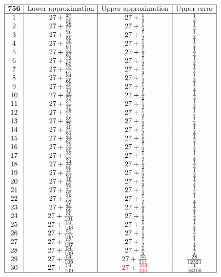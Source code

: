 \documentclass{amsart}
\begin{document}
$$\begin{array}{|c|c|c|c|}
 \hline
 {\bf 756}&\text{Lower approximation}&\text{Upper approximation}&\text{Upper error}\\
 \hline
 1&27+\frac{27}{55}&27+\frac{1}{2}&\frac{1}{4}\\
2&27+\frac{28}{57}&27+\frac{1}{2}&\frac{1}{4}\\
3&27+\frac{29}{59}&27+\frac{1}{2}&\frac{1}{4}\\
4&27+\frac{30}{61}&27+\frac{1}{2}&\frac{1}{4}\\
5&27+\frac{31}{63}&27+\frac{1}{2}&\frac{1}{4}\\
6&27+\frac{32}{65}&27+\frac{1}{2}&\frac{1}{4}\\
7&27+\frac{33}{67}&27+\frac{1}{2}&\frac{1}{4}\\
8&27+\frac{34}{69}&27+\frac{1}{2}&\frac{1}{4}\\
9&27+\frac{35}{71}&27+\frac{1}{2}&\frac{1}{4}\\
10&27+\frac{36}{73}&27+\frac{1}{2}&\frac{1}{4}\\
11&27+\frac{37}{75}&27+\frac{1}{2}&\frac{1}{4}\\
12&27+\frac{38}{77}&27+\frac{1}{2}&\frac{1}{4}\\
13&27+\frac{39}{79}&27+\frac{1}{2}&\frac{1}{4}\\
14&27+\frac{40}{81}&27+\frac{1}{2}&\frac{1}{4}\\
15&27+\frac{41}{83}&27+\frac{1}{2}&\frac{1}{4}\\
16&27+\frac{42}{85}&27+\frac{1}{2}&\frac{1}{4}\\
17&27+\frac{43}{87}&27+\frac{1}{2}&\frac{1}{4}\\
18&27+\frac{44}{89}&27+\frac{1}{2}&\frac{1}{4}\\
19&27+\frac{45}{91}&27+\frac{1}{2}&\frac{1}{4}\\
20&27+\frac{46}{93}&27+\frac{1}{2}&\frac{1}{4}\\
21&27+\frac{47}{95}&27+\frac{1}{2}&\frac{1}{4}\\
22&27+\frac{48}{97}&27+\frac{1}{2}&\frac{1}{4}\\
23&27+\frac{49}{99}&27+\frac{1}{2}&\frac{1}{4}\\
24&27+\frac{50}{101}&27+\frac{1}{2}&\frac{1}{4}\\
25&27+\frac{51}{103}&27+\frac{1}{2}&\frac{1}{4}\\
26&27+\frac{52}{105}&27+\frac{1}{2}&\frac{1}{4}\\
27&27+\frac{53}{107}&27+\frac{1}{2}&\frac{1}{4}\\
28&27+\frac{54}{109}&27+\frac{1}{2}&\frac{1}{4}\\
29&27+\frac{54}{109}&27+\frac{55}{111}&\frac{28}{12321}\\
30&27+\frac{54}{109}&{\color{red}27+\frac{109}{220}}&\frac{1}{48400}\\
 \hline
\end{array}$$
\end{document}
